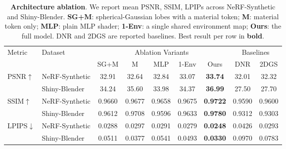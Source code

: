 \begin{table}[t]
  \centering
  \small
  \setlength{\tabcolsep}{4pt}
  \caption{\textbf{Architecture ablation}. We report mean PSNR, SSIM, LPIPs across NeRF-Synthetic and Shiny-Blender.
  \textbf{SG+M}: spherical-Gaussian lobes with a material token;
  \textbf{M}: material token only;
  \textbf{MLP}: plain MLP shader;
  \textbf{1-Env}: a single shared environment map;
  \textbf{Ours}: the full model.
  DNR and 2DGS are reported baselines. Best result per row in \textbf{bold}.}
  \label{tab:ablation}
  \begin{tabular}{ll ccccc cc}
    \toprule
    \multirow{2}{*}{Metric} & \multirow{2}{*}{Dataset}
    & \multicolumn{5}{c}{Ablation Variants}
    & \multicolumn{2}{c}{Baselines} \\
    \cmidrule(lr){3-7} \cmidrule(lr){8-9}
    & & SG+M & M & MLP & 1-Env & Ours & DNR & 2DGS \\
    \midrule
    \multirow{2}{*}{PSNR$\uparrow$}
    & NeRF-Synthetic & 32.91 & 32.64 & 32.84 & 33.07 & \textbf{33.74} & 32.01 & 32.32 \\
    & Shiny-Blender  & 34.24 & 35.60 & 33.98 & 34.37 & \textbf{36.99} & 27.50 & 27.70 \\
    \midrule
    \multirow{2}{*}{SSIM$\uparrow$}
    & NeRF-Synthetic & 0.9660 & 0.9677 & 0.9658 & 0.9675 & \textbf{0.9722} & 0.9590 & 0.9600 \\
    & Shiny-Blender  & 0.9612 & 0.9708 & 0.9596 & 0.9633 & \textbf{0.9780} & 0.9312 & 0.9303 \\
    \midrule
    \multirow{2}{*}{LPIPS$\downarrow$}
    & NeRF-Synthetic & 0.0288 & 0.0297 & 0.0291 & 0.0279 & \textbf{0.0248} & 0.0426 & 0.0293 \\
    & Shiny-Blender  & 0.0511 & 0.0377 & 0.0541 & 0.0493 & \textbf{0.0330} & 0.0970 & 0.0783 \\
    \bottomrule
  \end{tabular}
\end{table}